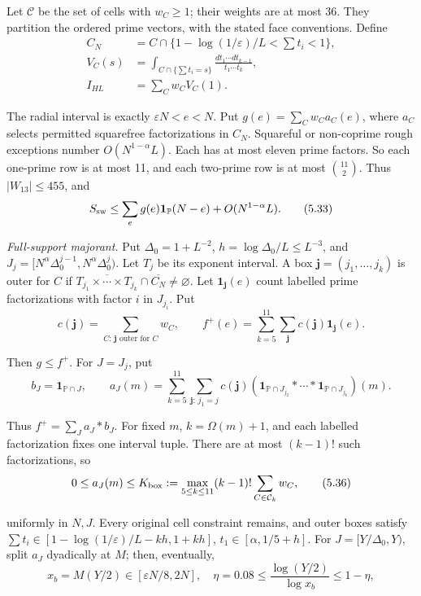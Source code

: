 Let $\mathcal C$ be the set of cells with $w_C\ge1$;
their weights are at most 36.
They partition the ordered prime vectors, with the stated face conventions.
Define
\begingroup\small
\[
\begin{aligned}
 C_N&=C\cap\{1-\log(1/\varepsilon)/L<\sum t_i<1\},\\
 V_C(s)&=\int_{C\cap\{\sum t_i=s\}}\frac{dt_1\cdots dt_{k-1}}{t_1\cdots t_k},\\
 I_{HL}&=\sum_Cw_CV_C(1).
\end{aligned}
\tag{5.32}
\]

\endgroup
The radial interval is exactly $\varepsilon N<e<N$.
Put $g(e)=\sum_Cw_Ca_C(e)$,
where $a_C$ selects permitted squarefree factorizations in $C_N$.
Squareful or non-coprime rough exceptions number $O(N^{1-\alpha}L)$.
Each has at most eleven prime factors.
So each one-prime row is at most 11,
and each two-prime row is at most $\binom{11}{2}$.
Thus $|W_{13}|\le455$, and
\[
 S_{\rm sw}\le\sum_e g(e)\mathbf1_{\mathbb P}(N-e)+O(N^{1-\alpha}L).
\tag{5.33}
\]

\emph{Full-support majorant.}
Put $\Delta_0=1+L^{-2}$, $h=\log\Delta_0/L\le L^{-3}$,
and $J_j=[N^\alpha\Delta_0^{j-1},N^\alpha\Delta_0^j)$.
Let $T_j$ be its exponent interval.
A box $\mathbf j=(j_1,\ldots,j_k)$ is outer for $C$ if
$\overline{T_{j_1}\times\cdots\times T_{j_k}}\cap\overline{C_N}\ne\varnothing$.
Let $\mathbf1_{\mathbf j}(e)$ count labelled prime factorizations
with factor $i$ in $J_{j_i}$.
Put
\[
 c(\mathbf j)=\sum_{C:\,\mathbf j\text{ outer for }C}w_C,\qquad
 f^+(e)=\sum_{k=5}^{11}\sum_{\mathbf j}c(\mathbf j)\mathbf1_{\mathbf j}(e).
\tag{5.34}
\]

Then $g\le f^+$.
For $J=J_j$, put
\[
 b_J=\mathbf1_{\mathbb P\cap J},\qquad
 a_J(m)=\sum_{k=5}^{11}\sum_{\mathbf j:\,j_1=j}c(\mathbf j)
  (\mathbf1_{\mathbb P\cap J_{j_2}}*\cdots*
   \mathbf1_{\mathbb P\cap J_{j_k}})(m).
\tag{5.35}
\]

Thus $f^+=\sum_Ja_J*b_J$.
For fixed $m$, $k=\Omega(m)+1$,
and each labelled factorization fixes one interval tuple.
There are at most $(k-1)!$ such factorizations, so
\[
 0\le a_J(m)\le K_{\rm box}:=\max_{5\le k\le11}(k-1)!\sum_{C\in\mathcal C_k}w_C,
\tag{5.36}
\]

uniformly in $N,J$.
Every original cell constraint remains, and outer boxes satisfy
$\sum t_i\in[1-\log(1/\varepsilon)/L-kh,1+kh]$,
$t_1\in[\alpha,1/5+h]$.
For $J=[Y/\Delta_0,Y)$, split $a_J$ dyadically at $M$;
then, eventually,
\[
 x_b=M(Y/2)\in[\varepsilon N/8,2N],\quad
 \eta=0.08\le\frac{\log(Y/2)}{\log x_b}\le1-\eta,
\tag{5.37}
\]

